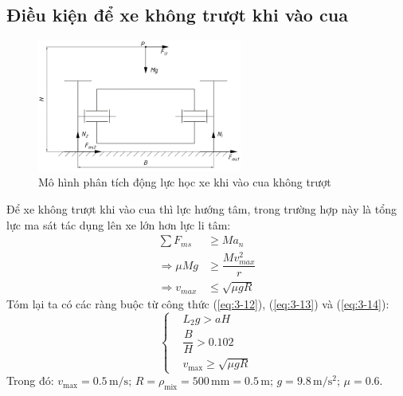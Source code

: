         \subsection{Điều kiện để xe không trượt khi vào cua}
            \begin{figure}[H]
                \centering
                \includegraphics[width=0.6\textwidth]{pictures/chapter3/c3_p3_TurningAnalysis2.png}
                \caption{Mô hình phân tích động lực học xe khi vào cua không trượt}
                \label{fig:3.3}
            \end{figure}
            \hspace*{0.6cm}Để xe không trượt khi vào cua thì lực hướng tâm, trong trường hợp này là tổng lực ma sát tác dụng lên xe lớn hơn lực li tâm:
            \begin{align}
                \sum F_{ms} &\geq Ma_n \label{eq:3-12} \\
                \Rightarrow \mu Mg &\geq \dfrac{Mv_{max}^2}{r} \label{eq:3-13} \\
                \Rightarrow v_{max} &\leq \sqrt{\mu gR} \label{eq:3-14}
            \end{align}
            \hspace*{0.6cm}Tóm lại ta có các ràng buộc từ công thức (\ref{eq:3-12}), (\ref{eq:3-13}) và (\ref{eq:3-14}):
            \begin{equation}
                \begin{cases}
                    &L_2 g > aH \\
                    &\dfrac{B}{H} > 0.102 \\
                    &v_{\text{max}} \geq \sqrt{\mu g R}
                \end{cases}
                \label{eq:3-15}
            \end{equation}
            \hspace*{0.6cm}Trong đó: $v_{\text{max}} = 0.5 \,\mathrm{m/s}; \, R = \rho_{\text{mix}} = 500 \,\mathrm{mm} = 0.5 \,\mathrm{m}; \, g = 9.8 \,\mathrm{m/s^2}; \, \mu = 0.6$.\\
